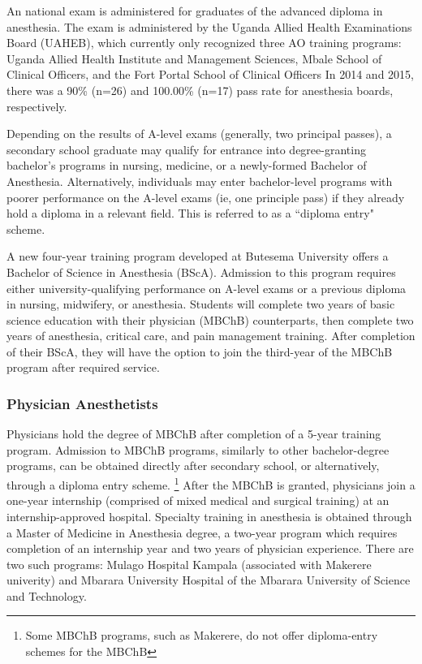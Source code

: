 \documentclass[12pt]{article} %
\begin{document}
An national exam is administered for graduates of the advanced diploma in anesthesia. The exam is administered by the Uganda Allied Health Examinations Board (UAHEB), which currently only recognized three AO training programs: Uganda Allied Health Institute and Management Sciences, Mbale School of Clinical Officers, and the Fort Portal School of Clinical Officers
\cite{examboardschools}
In 2014 and 2015, there was a 90\%  (n=26) and 100.00\% (n=17) pass rate for anesthesia boards, respectively.
\cite{examboard2015}

Depending on the results of A-level exams (generally, two principal passes), a secondary school graduate may qualify for entrance into degree-granting bachelor's programs in nursing, medicine, or a newly-formed Bachelor of Anesthesia. Alternatively, individuals may enter bachelor-level programs with poorer performance on the A-level exams (ie, one principle pass) if they already hold a diploma in a relevant field. This is referred to as a ``diploma entry" scheme.
\cite{mak2018}

A new four-year training program developed at Butesema University offers a Bachelor of Science in Anesthesia (BScA). Admission to this program requires either university-qualifying performance on A-level exams or a previous diploma in nursing, midwifery, or anesthesia. Students will complete two years of basic science education with their physician (MBChB) counterparts, then complete two years of anesthesia, critical care, and pain management training. After completion of their BScA, they will have the option to join the third-year of the MBChB program after required service.
\cite{aau2018}

\subsubsection{Physician Anesthetists}

Physicians hold the degree of MBChB after completion of a 5-year training program. Admission to MBChB programs, similarly to other bachelor-degree programs, can be obtained directly after secondary school, or alternatively, through a diploma entry scheme. \footnote{Some MBChB programs, such as Makerere, do not offer diploma-entry schemes for the MBChB} After the MBChB is granted, physicians join a one-year internship (comprised of mixed medical and surgical training) at an internship-approved hospital.
\cite{must2014}
Specialty training in anesthesia is obtained through a Master of Medicine in Anesthesia degree, a two-year program which requires completion of an internship year and two years of physician experience. There are two such programs: Mulago Hospital Kampala (associated with Makerere univerity) and Mbarara University Hospital of the Mbarara University of Science and Technology.
\end{document}
